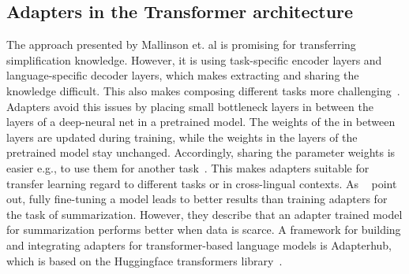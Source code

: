


\subsection{Adapters in the Transformer architecture}
The approach presented by Mallinson et. al is promising for transferring simplification knowledge. However, it is using task-specific
encoder layers and language-specific decoder layers, which makes extracting and sharing the knowledge difficult.
This also makes composing different tasks more challenging~\cite{Pfeiffer2020}.
Adapters avoid this issues by placing small bottleneck layers in between the layers of a deep-neural net in a pretrained model.
The weights of the in between layers are updated during training, while the weights in the layers of the pretrained model stay unchanged.
Accordingly, sharing the parameter weights is easier e.g., to use them for another task~\cite{Houlsby2019}.
This makes adapters suitable for transfer learning regard to different tasks or in cross-lingual contexts.
As ~\citet{Zhao2022} point out, fully fine-tuning a model leads to better results than training adapters for the task of summarization.
However, they describe that an adapter trained model for summarization performs better when data is scarce.
A framework for building and integrating adapters for transformer-based language models is Adapterhub, which is based on
the Huggingface transformers library~\cite{Pfeiffer2023, Huggingface2023}.

